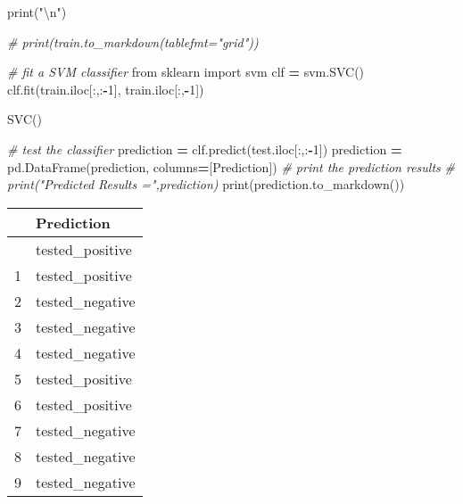 \documentclass[
]{article}
\newenvironment{Shaded}{\begin{snugshade}}{\end{snugshade}}
\newcommand{\BuiltInTok}[1]{#1}
\newcommand{\CharTok}[1]{\textcolor[rgb]{0.31,0.60,0.02}{#1}}
\newcommand{\CommentTok}[1]{\textcolor[rgb]{0.56,0.35,0.01}{\textit{#1}}}
\newcommand{\DecValTok}[1]{\textcolor[rgb]{0.00,0.00,0.81}{#1}}
\newcommand{\ImportTok}[1]{#1}
\newcommand{\NormalTok}[1]{#1}
\newcommand{\OperatorTok}[1]{\textcolor[rgb]{0.81,0.36,0.00}{\textbf{#1}}}
\newcommand{\StringTok}[1]{\textcolor[rgb]{0.31,0.60,0.02}{#1}}
\begin{document}
\begin{Shaded}
\begin{Highlighting}[]
\BuiltInTok{print}\NormalTok{(}\StringTok{"}\CharTok{\textbackslash{}n}\StringTok{"}\NormalTok{)}
\end{Highlighting}
\end{Shaded}

\begin{Shaded}
\begin{Highlighting}[]
\CommentTok{\# print(train.to\_markdown(tablefmt="grid"))}

\CommentTok{\# fit a SVM classifier}
\ImportTok{from}\NormalTok{ sklearn }\ImportTok{import}\NormalTok{ svm}
\NormalTok{clf }\OperatorTok{=}\NormalTok{ svm.SVC()}
\NormalTok{clf.fit(train.iloc[:,:}\OperatorTok{{-}}\DecValTok{1}\NormalTok{], train.iloc[:,}\OperatorTok{{-}}\DecValTok{1}\NormalTok{])}
\end{Highlighting}
\end{Shaded}

SVC()

\begin{Shaded}
\begin{Highlighting}[]
\CommentTok{\# test the classifier}
\NormalTok{prediction }\OperatorTok{=}\NormalTok{ clf.predict(test.iloc[:,:}\OperatorTok{{-}}\DecValTok{1}\NormalTok{])}
\NormalTok{prediction }\OperatorTok{=}\NormalTok{ pd.DataFrame(prediction, columns}\OperatorTok{=}\NormalTok{[}\StringTok{\textquotesingle{}Prediction\textquotesingle{}}\NormalTok{])}
\CommentTok{\# print the prediction results}
\CommentTok{\# print("Predicted Results =",prediction)}
\BuiltInTok{print}\NormalTok{(prediction.to\_markdown())}
\end{Highlighting}
\end{Shaded}

\begin{longtable}[]{@{}rl@{}}
\toprule\noalign{}
& Prediction \\
\midrule\noalign{}
\endhead
\bottomrule\noalign{}
\endlastfoot
0 & tested\_positive \\
1 & tested\_positive \\
2 & tested\_negative \\
3 & tested\_negative \\
4 & tested\_negative \\
5 & tested\_positive \\
6 & tested\_positive \\
7 & tested\_negative \\
8 & tested\_negative \\
9 & tested\_negative \\
\end{longtable}
\end{document}
